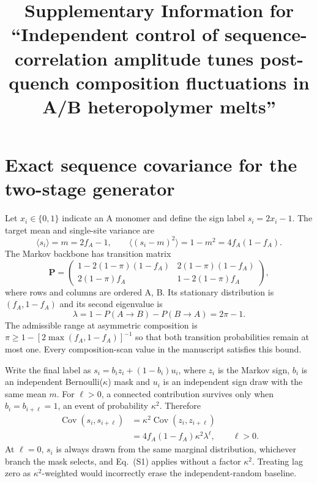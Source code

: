 \documentclass[pdflatex,sn-nature,onecolumn]{sn-jnl}
\title{Supplementary Information for ``Independent control of sequence-correlation amplitude tunes post-quench composition fluctuations in A/B heteropolymer melts''}
\author*{\fnm{Alexander Okezue} \sur{Bell}}\email{okezue@stanford.edu}
\affil{\orgname{Stanford University}, \orgaddress{\street{450 Jane Stanford Way}, \city{Stanford}, \state{CA}, \postcode{94305}, \country{USA}}}
\begin{document}
\maketitle
\raggedright
\raggedbottom
\pagestyle{plain}
\thispagestyle{plain}
\renewcommand{\thefigure}{S\arabic{figure}}
\renewcommand{\tablename}{Supplementary Table}
\renewcommand{\thetable}{S\arabic{table}}

\section*{Exact sequence covariance for the two-stage generator}

Let $x_i\in\{0,1\}$ indicate an A monomer and define the sign label $s_i=2x_i-1$. The target mean and single-site variance are
\begin{equation}
\langle s_i\rangle=m=2f_A-1,\qquad
\langle(s_i-m)^2\rangle=1-m^2=4f_A(1-f_A).
\tag{S1}
\end{equation}
The Markov backbone has transition matrix
\begin{equation}
\bm{P}=\begin{pmatrix}
1-2(1-\pi)(1-f_A) & 2(1-\pi)(1-f_A)\\
2(1-\pi)f_A & 1-2(1-\pi)f_A
\end{pmatrix},
\tag{S2}
\end{equation}
where rows and columns are ordered A, B. Its stationary distribution is $(f_A,1-f_A)$ and its second eigenvalue is
\begin{equation}
\lambda=1-P(A\rightarrow B)-P(B\rightarrow A)=2\pi-1.
\tag{S3}
\end{equation}
The admissible range at asymmetric composition is $\pi\ge 1-[2\max(f_A,1-f_A)]^{-1}$ so that both transition probabilities remain at most one. Every composition-scan value in the manuscript satisfies this bound.

Write the final label as $s_i=b_i z_i+(1-b_i)u_i$, where $z_i$ is the Markov sign, $b_i$ is an independent Bernoulli($\kappa$) mask and $u_i$ is an independent sign draw with the same mean $m$. For $\ell>0$, a connected contribution survives only when $b_i=b_{i+\ell}=1$, an event of probability $\kappa^2$. Therefore
\begin{align}
\operatorname{Cov}(s_i,s_{i+\ell})
&=\kappa^2\operatorname{Cov}(z_i,z_{i+\ell})\nonumber\\
&=4f_A(1-f_A)\kappa^2\lambda^\ell,\qquad \ell>0.
\tag{S4}
\end{align}
At $\ell=0$, $s_i$ is always drawn from the same marginal distribution, whichever branch the mask selects, and Eq.~(S1) applies without a factor $\kappa^2$. Treating lag zero as $\kappa^2$-weighted would incorrectly erase the independent-random baseline.
\end{document}
